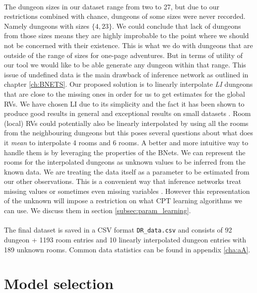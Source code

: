 \documentclass{UoYCSproject}
\begin{document}
\paragraph{}
The dungeon sizes in our dataset range from two to 27, but due to our restrictions combined with chance, dungeons of some sizes were never recorded. Namely dungeons with sizes \(\{4,23\}\). We could conclude that lack of dungeons from those sizes means they are highly improbable to the point where we should not be concerned with their existence. This is what we do with dungeons that are outside of the range of sizes for one-page adventures. But in terms of utility of our tool we would like to be able generate any dungeon within that range. This issue of undefined data is the main drawback of inference network as outlined in chapter \ref{ch:BNETS}. Our proposed solution is to linearly interpolate \textit{LI} dungeons that are close to the missing ones in order for us to get estimates for the global RVs. We have chosen LI due to its simplicity and the fact it has been shown to produce good results in general \parencite{Ibargengoytia2013OnTE} and exceptional results on small datasets \parencite{yu2004advances}. Room (local) RVs could potentially also be linearly interpolated by using all the rooms from the neighbouring dungeons but this poses several questions about what does it \textit{mean} to interpolate 4 rooms and 6 rooms. A better and more intuitive way to handle them is by leveraging the properties of the BNets. We can represent the rooms for the interpolated dungeons as unknown values to be inferred from the known data. We are treating the data itself as a parameter to be estimated from our other observations. This is a convenient way that inference networks treat missing values or sometimes even missing variables \parencite[p45]{neticaCman}. However this representation of the unknown will impose a restriction on what CPT learning algorithms we can use. We discuss them in section \ref{subsec:param_learning}.

\paragraph{}
The final dataset is saved in a CSV format \texttt{DR\_data.csv} and consists of 92 dungeon + 1193 room entries and 10 linearly interpolated dungeon entries with 189 unknown rooms. Common data statistics can be found in appendix \ref{cha:aA}.

\section{Model selection} %
\label{sec:model_selection}
\end{document}
